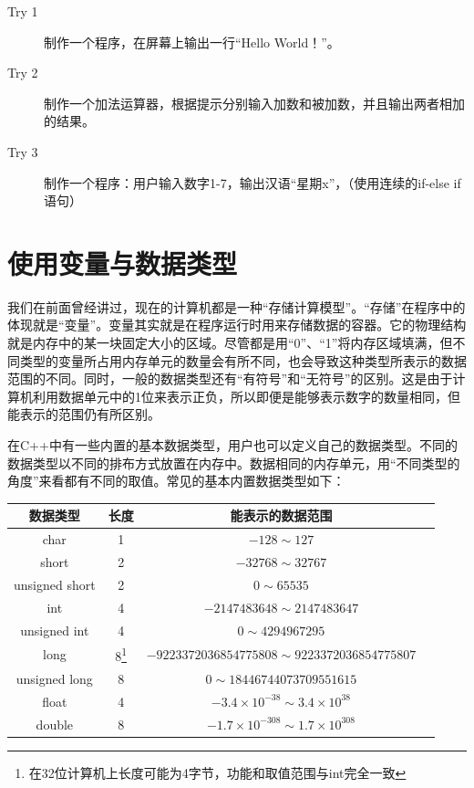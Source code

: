\begin{description}
	\item[Try 1]制作一个程序，在屏幕上输出一行“Hello World！”。
	\item[Try 2]制作一个加法运算器，根据提示分别输入加数和被加数，并且输出两者相加的结果。
	\item[Try 3]制作一个程序：用户输入数字1-7，输出汉语“星期x”，（使用连续的if-else if语句）
\end{description}

\section{使用变量与数据类型}
我们在前面曾经讲过，现在的计算机都是一种“存储计算模型”。“存储”在程序中的体现就是“变量”。变量其实就是在程序运行时用来存储数据的容器。它的物理结构就是内存中的某一块固定大小的区域。尽管都是用“0”、“1”将内存区域填满，但不同类型的变量所占用内存单元的数量会有所不同，也会导致这种类型所表示的数据范围的不同。同时，一般的数据类型还有“有符号”和“无符号”的区别。这是由于计算机利用数据单元中的1位来表示正负，所以即便是能够表示数字的数量相同，但能表示的范围仍有所区别。

在C++中有一些内置的基本数据类型，用户也可以定义自己的数据类型。不同的数据类型以不同的排布方式放置在内存中。数据相同的内存单元，用“不同类型的角度”来看都有不同的取值。常见的基本内置数据类型如下：

\begin{center}
	\begin{tabular}{|c|c|c|c|}
		\hline
			数据类型 & 长度 & 能表示的数据范围\\
		\hline
			char & 1 & $-128 \sim 127$				\\
			short & 2 & $-32768 \sim 32767$			\\
			unsigned short & 2	 & $0 \sim 65535$\\
			int & 4 & $-2147483648 \sim 2147483647$	\\
			unsigned int & 4 & $0 \sim 4294967295$ \\
			long & 8\footnote{在32位计算机上长度可能为4字节，功能和取值范围与int完全一致} & $-9223372036854775808 \sim 9223372036854775807$	\\
			unsigned long & 8 & $0 \sim 18446744073709551615$ \\
			float & 4 & $-3.4\times10^{-38} \sim 3.4\times10^{38} $ \\
			double & 8 & $-1.7\times10^{-308} \sim 1.7\times10^{308} $\\
		\hline
	\end{tabular}
\end{center}

